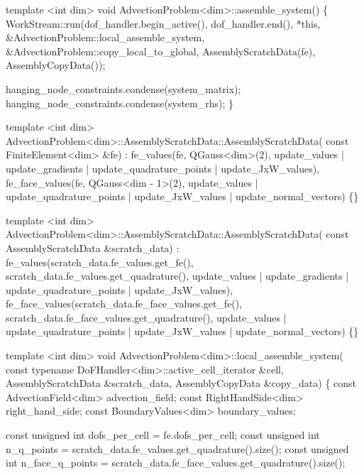 \begin{DoxyCodeInclude}
\textcolor{keyword}{template} <\textcolor{keywordtype}{int} dim>
\textcolor{keywordtype}{void} AdvectionProblem<dim>::assemble\_system()
\{
    WorkStream::run(dof\_handler.begin\_active(), dof\_handler.end(), *\textcolor{keyword}{this},
                    &AdvectionProblem::local\_assemble\_system,
                    &AdvectionProblem::copy\_local\_to\_global,
                    AssemblyScratchData(fe), AssemblyCopyData());


    hanging\_node\_constraints.condense(system\_matrix);
    hanging\_node\_constraints.condense(system\_rhs);
\}


\textcolor{keyword}{template} <\textcolor{keywordtype}{int} dim>
AdvectionProblem<dim>::AssemblyScratchData::AssemblyScratchData(
    \textcolor{keyword}{const} FiniteElement<dim> &fe)
    : fe\_values(fe, QGauss<dim>(2),
                update\_values | update\_gradients | update\_quadrature\_points |
                    update\_JxW\_values),
      fe\_face\_values(fe, QGauss<dim - 1>(2),
                     update\_values | update\_quadrature\_points |
                         update\_JxW\_values | update\_normal\_vectors)
\{\}


\textcolor{keyword}{template} <\textcolor{keywordtype}{int} dim>
AdvectionProblem<dim>::AssemblyScratchData::AssemblyScratchData(
    \textcolor{keyword}{const} AssemblyScratchData &scratch\_data)
    : fe\_values(scratch\_data.fe\_values.get\_fe(),
                scratch\_data.fe\_values.get\_quadrature(),
                update\_values | update\_gradients | update\_quadrature\_points |
                    update\_JxW\_values),
      fe\_face\_values(scratch\_data.fe\_face\_values.get\_fe(),
                     scratch\_data.fe\_face\_values.get\_quadrature(),
                     update\_values | update\_quadrature\_points |
                         update\_JxW\_values | update\_normal\_vectors)
\{\}


\textcolor{keyword}{template} <\textcolor{keywordtype}{int} dim>
\textcolor{keywordtype}{void} AdvectionProblem<dim>::local\_assemble\_system(
    \textcolor{keyword}{const} \textcolor{keyword}{typename} DoFHandler<dim>::active\_cell\_iterator &cell,
    AssemblyScratchData &scratch\_data, AssemblyCopyData &copy\_data)
\{
    \textcolor{keyword}{const} AdvectionField<dim> advection\_field;
    \textcolor{keyword}{const} RightHandSide<dim> right\_hand\_side;
    \textcolor{keyword}{const} BoundaryValues<dim> boundary\_values;

    \textcolor{keyword}{const} \textcolor{keywordtype}{unsigned} \textcolor{keywordtype}{int} dofs\_per\_cell = fe.dofs\_per\_cell;
    \textcolor{keyword}{const} \textcolor{keywordtype}{unsigned} \textcolor{keywordtype}{int} n\_q\_points =
        scratch\_data.fe\_values.get\_quadrature().size();
    \textcolor{keyword}{const} \textcolor{keywordtype}{unsigned} \textcolor{keywordtype}{int} n\_face\_q\_points =
        scratch\_data.fe\_face\_values.get\_quadrature().size();


\end{DoxyCodeInclude}
